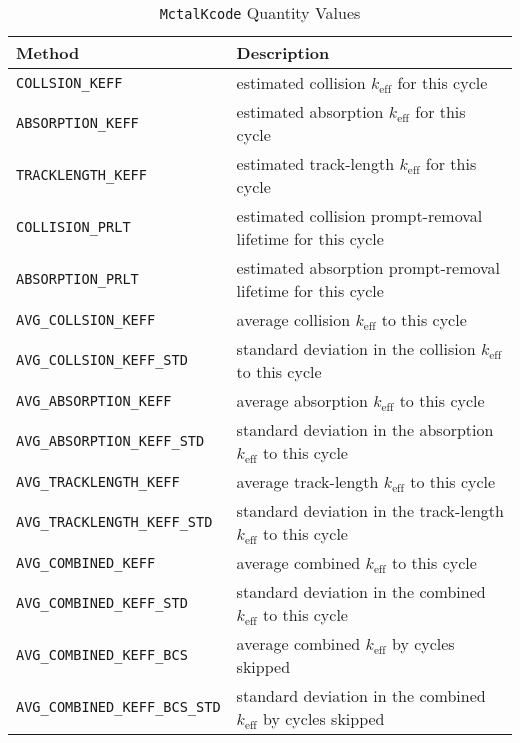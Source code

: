 \documentclass[11pt]{article}
\begin{document}
\begin{table}[]
  \begin{center}
  \caption{\texttt{MctalKcode} Quantity Values}
  \label{tab:mctalkcode_quantity_values}
    \begin{tabular}{lp{4.0in}}
      \toprule
        Method & Description \\
      \midrule
        \texttt{COLLSION\_KEFF}                & estimated collision $k_{\mathrm{eff}}$ for this cycle \\
        \texttt{ABSORPTION\_KEFF}              & estimated absorption $k_{\mathrm{eff}}$ for this cycle \\
        \texttt{TRACKLENGTH\_KEFF}             & estimated track-length $k_{\mathrm{eff}}$ for this cycle \\
        \texttt{COLLISION\_PRLT}               & estimated collision prompt-removal lifetime for this cycle \\
        \texttt{ABSORPTION\_PRLT}              & estimated absorption prompt-removal lifetime for this cycle \\
        \texttt{AVG\_COLLSION\_KEFF}           & average collision $k_{\mathrm{eff}}$ to this cycle \\
        \texttt{AVG\_COLLSION\_KEFF\_STD}      & standard deviation in the collision $k_{\mathrm{eff}}$ to this cycle \\
        \texttt{AVG\_ABSORPTION\_KEFF}         & average absorption $k_{\mathrm{eff}}$ to this cycle \\
        \texttt{AVG\_ABSORPTION\_KEFF\_STD}    & standard deviation in the absorption $k_{\mathrm{eff}}$ to this cycle \\
        \texttt{AVG\_TRACKLENGTH\_KEFF}        & average track-length $k_{\mathrm{eff}}$ to this cycle \\
        \texttt{AVG\_TRACKLENGTH\_KEFF\_STD}   & standard deviation in the track-length $k_{\mathrm{eff}}$ to this cycle \\
        \texttt{AVG\_COMBINED\_KEFF}           & average combined $k_{\mathrm{eff}}$ to this cycle \\
        \texttt{AVG\_COMBINED\_KEFF\_STD}      & standard deviation in the combined $k_{\mathrm{eff}}$ to this cycle \\
        \texttt{AVG\_COMBINED\_KEFF\_BCS}      & average combined $k_{\mathrm{eff}}$ by cycles skipped \\
        \texttt{AVG\_COMBINED\_KEFF\_BCS\_STD} & standard deviation in the combined $k_{\mathrm{eff}}$ by cycles skipped \\

\end{tabular}
\end{center}
\end{table}
\end{document}
